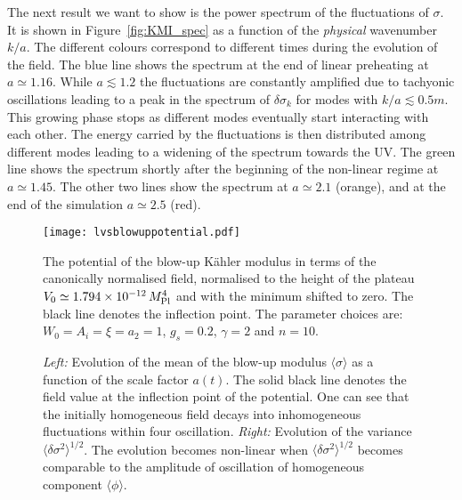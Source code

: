 \documentclass[12pt]{article}
\begin{document}
The next result we want to show is the power spectrum of the fluctuations of $\sigma$. It is shown in Figure~\ref{fig:KMI_spec} as a function of the \textit{physical} wavenumber $k/a$. The different colours correspond to different times during the evolution of the field. The blue line shows the spectrum at the end of linear preheating at $a\simeq1.16$. While $a\lesssim1.2$ the fluctuations are constantly amplified due to tachyonic oscillations leading to a peak in the spectrum of $\delta\sigma_k$ for modes with $k/a\lesssim 0.5m$. This growing phase stops as different modes eventually start interacting with each other. The energy carried by the fluctuations is then distributed among different modes leading to a widening of the spectrum towards the UV. The green line shows the spectrum shortly after the beginning of the non-linear regime at $a\simeq1.45$. The other two lines show the spectrum at $a\simeq2.1$ (orange), and at the end of the simulation $a\simeq2.5$ (red). 


\begin{figure}
\begin{center}\texttt{[image: lvsblowuppotential.pdf]}
\end{center}
\caption{The potential of the blow-up K\"ahler modulus in terms of the canonically normalised field, normalised to the height of the plateau $V_0 \simeq 1.794\times10^{-12}\,M^4_{\rm Pl}$ and with the minimum shifted to zero. The black line denotes the inflection point. The parameter choices are: $W_0=A_i=\xi=a_2=1$, $g_s=0.2$, $\gamma=2$ and $n=10.$}
\label{fig:potential_kmi}
\end{figure}



\begin{figure}
\centering
{}
\hfill
{}
\caption{\textit{Left:} Evolution of the mean of the blow-up modulus $\langle\sigma\rangle$ as a function of the scale factor $a(t)$. The solid black line denotes the field value at the inflection point of the potential. One can see that the initially homogeneous field decays into inhomogeneous fluctuations within four oscillation. \textit{Right:} Evolution of the variance $\langle\delta\sigma^2\rangle^{1/2}$. The evolution becomes non-linear when $\langle\delta\sigma^2\rangle^{1/2}$ becomes comparable to the amplitude of oscillation of  homogeneous component $\langle\phi\rangle$.}
\label{fig:mean_variance}
\end{figure}
\end{document}
